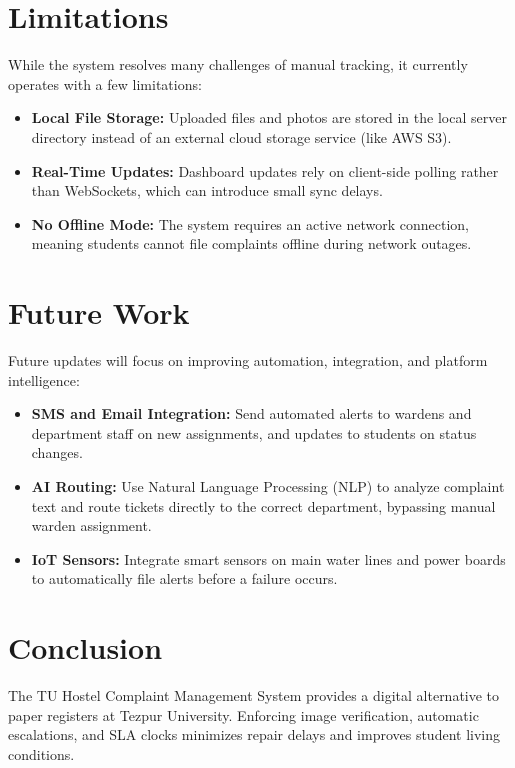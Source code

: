 \documentclass[12pt,a4paper]{article}
\begin{document}
\newpage
\section{Limitations}
While the system resolves many challenges of manual tracking, it currently operates with a few limitations:
\begin{itemize}
    \item \textbf{Local File Storage:} Uploaded files and photos are stored in the local server directory instead of an external cloud storage service (like AWS S3).
    \item \textbf{Real-Time Updates:} Dashboard updates rely on client-side polling rather than WebSockets, which can introduce small sync delays.
    \item \textbf{No Offline Mode:} The system requires an active network connection, meaning students cannot file complaints offline during network outages.
\end{itemize}

\newpage
\section{Future Work}
Future updates will focus on improving automation, integration, and platform intelligence:
\begin{itemize}
    \item \textbf{SMS and Email Integration:} Send automated alerts to wardens and department staff on new assignments, and updates to students on status changes.
    \item \textbf{AI Routing:} Use Natural Language Processing (NLP) to analyze complaint text and route tickets directly to the correct department, bypassing manual warden assignment.
    \item \textbf{IoT Sensors:} Integrate smart sensors on main water lines and power boards to automatically file alerts before a failure occurs.
\end{itemize}

\newpage
\section{Conclusion}
The TU Hostel Complaint Management System provides a digital alternative to paper registers at Tezpur University. Enforcing image verification, automatic escalations, and SLA clocks minimizes repair delays and improves student living conditions.
\end{document}
